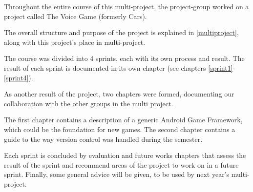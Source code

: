 Throughout the entire course of this multi-project, the project-group worked on a project called The Voice Game (formerly Cars).

The overall structure and purpose of the project is explained in \cref{multiproject}, along with this project's place in multi-project.

The course was divided into 4 sprints, each with its own process and result.
The result of each sprint is documented in its own chapter (see chapters \ref{sprint1}-\ref{sprint4}).

As another result of the project, two chapters were formed, documenting our collaboration with the other groups in the multi project.

The first chapter contains a description of a generic Android Game Framework, which could be the foundation for new games.
The second chapter contains a guide to the way version control was handled during the semester.

Each sprint is concluded by evaluation and future works chapters that assess the result of the sprint and recommend areas of the project to work on in a future sprint.
Finally, some general advice will be given, to be used by next year's multi-project.